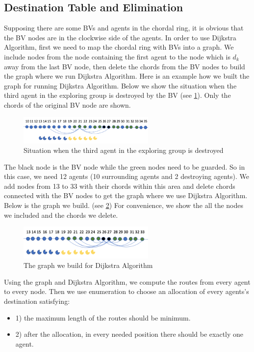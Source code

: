 \subsection{Destination Table and Elimination}
Supposing there are some BVs and agents in the chordal ring, it is obvious that the BV nodes are in the clockwise side of the agents. In order to use Dijkstra Algorithm, first we need to map the chordal ring with BVs into a graph. We include nodes from the node containing the first agent to the node which is $d_k$ away from the last BV node, then delete the chords from the BV nodes to build the graph where we run Dijkstra Algorithm.
Here is an example how we built the graph for running Dijkstra Algorithm. Below we show the situation when the third agent in the exploring group is destroyed by the BV (see \ref{fig:D1}). Only the chords of the original BV node are shown. 
\begin{figure}[H]
  \centering  
  \includegraphics[width=0.6\textwidth]{figures/D1.png}
  \caption{Situation when the third agent in the exploring group is destroyed}\label{fig:D1}
\end{figure} 

The black node is the BV node while the green nodes need to be guarded. So in this case, we need 12 agents (10 surrounding agents and 2 destroying agents). 
We add nodes from 13 to 33 with their chords within this area and delete chords connected with the BV nodes to get the graph where we use Dijkstra Algorithm. Below is the graph we build. (see \ref{fig:D2}) For convenience, we show the all the nodes we included and the chords we delete.
\begin{figure}[H]
  \centering  
  \includegraphics[width=0.6\textwidth]{figures/D2.png}
  \caption{The graph we build for Dijkstra Algorithm}\label{fig:D2}
\end{figure} 
Using the graph and Dijkstra Algorithm, we compute the routes from every agent to every node. Then we use enumeration to choose an allocation of every agents's destination satisfying: 
\begin{itemize}
\item 1) the maximum length of the routes should be minimum. 
\item 2) after the allocation, in every needed position there should be exactly one agent.
\end{itemize}

